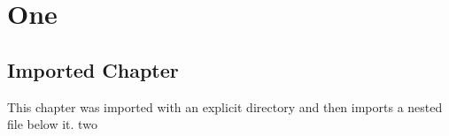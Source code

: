 \chapter{One}
\section{Imported Chapter}
This chapter was imported with an explicit directory and then imports a nested file below it.
{two}
